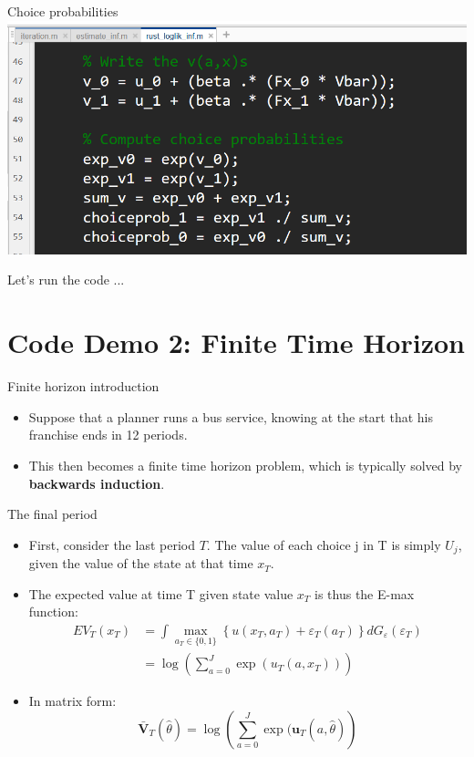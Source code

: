 \documentclass[aspectratio=169]{beamer}
\begin{document}
	
	\begin{frame}{Choice probabilities}
		\includegraphics[width=\textwidth]{figs/4_choiceprob.PNG}
	\end{frame}
	
	
	\begin{frame}{Let's run the code}
		...
	\end{frame}
	
	
	\section{Code Demo 2: Finite Time Horizon}
	\begin{frame}{Finite horizon introduction}
		\begin{itemize}
			\itemsep1em
			\item Suppose that a planner runs a bus service, knowing at the start that his franchise ends in 12 periods.
			\item This then becomes a finite time horizon problem, which is typically solved by \textbf{backwards induction}.
		\end{itemize}
	\end{frame}
	\begin{frame}{The final period}
		\begin{itemize}
			\item First, consider the last period $T$. The value of each choice j in T is simply $U_j$, given the value of the state at that time $x_T$. 
			\item The expected value at time T given state value $x_T$ is thus the E-max function:
			\begin{align}
				EV_T(x_T) &= \int \max_{a_T \in \{0,1\}} \left\{ u(x_T,a_T) + \varepsilon_T(a_T) \right\} dG_\varepsilon(\varepsilon_T) \\
				&= \log \left(\sum_{a=0}^J \exp(u_T(a,x_T))\right)
			\end{align}
			\item In matrix form:
			\begin{equation}
				\bar{\bm{V}}_T(\hat{\theta}) = \log \left( \sum_{a=0}^J \exp(\bm{u}_T(a,\hat{\theta}) \right)
			\end{equation}
		\end{itemize}
	\end{frame}
	
\end{document}
